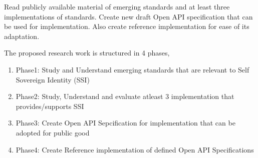 Read publicly available material of emerging standards and at least three implementations of standards. Create new draft Open API specification that can be used for implementation. Also create reference implementation for ease of its adaptation. 

\par The proposed research work is structured in 4 phases,

\begin{enumerate}
    \item Phase1: Study and Understand emerging standards that are relevant to Self Sovereign Identity (SSI)
    \item Phase2: Study, Understand and evaluate atleast 3 implementation that provides/supports SSI
    \item Phase3: Create Open API Sepcification for implementation that can be adopted for public good
    \item Phase4: Create Reference implementation of defined Open API Specifications
\end{enumerate}

